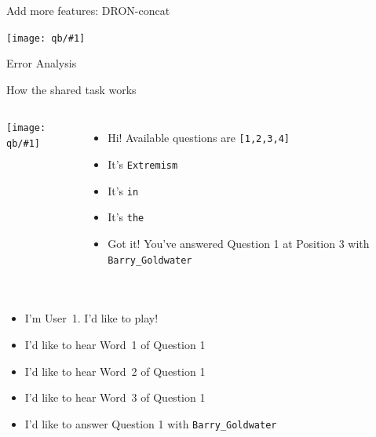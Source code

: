 \documentclass[xcolor=dvipsnames]{beamer}
\newcommand{\gfxq}[2]{
\begin{center}
	\texttt{[image: qb/\#1]}
\end{center}
}
\begin{document}
\begin{frame}{Add more features: DRON-concat}

  \gfxq{dron-concat}{.8}

\end{frame}


\begin{frame}{Error Analysis}

  \only<1>{\gfxq{error1}{.8}}
  \only<2>{\gfxq{error2}{.8}}
  \only<3>{\gfxq{error3}{.8}}
  \only<4>{\gfxq{error4}{.8}}
  \only<5>{\gfxq{error5}{.8}}
  \only<6>{\gfxq{error6}{.8}}
  \only<7>{\gfxq{error7}{.8}}

\end{frame}



\begin{frame}{How the shared task works}

\begin{columns}
  \gfxq{bamber}{.5}

  \begin{itemize}
    \item<3-> Hi! Available questions are \texttt{[1,2,3,4]}
    \item<5-> It's \texttt{Extremism}
    \item<7-> It's \texttt{in}
    \item<9-> It's \texttt{the}
    \item<11-> Got it!  You've answered Question 1 at Position
      3 with \texttt{Barry\_Goldwater}
  \end{itemize}

\end{columns}


\begin{columns}

  \begin{itemize}
    \item<2-> I'm User~1.  I’d like to play!
    \item<4-> I’d like to hear Word~1 of Question 1
    \item<6-> I’d like to hear Word~2 of Question 1
    \item<8-> I’d like to hear Word~3 of Question 1
    \item<10-> I’d like to answer Question 1 with
      \texttt{Barry\_Goldwater}
    \end{itemize}
  \only<2->{\gfxq{buzzer}{.5}}
\end{columns}

\end{frame}
\end{document}
